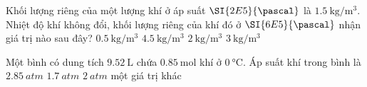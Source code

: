 \begin{ex}
	Khối lượng riêng của một lượng khí ở áp suất $\SI{2E5}{\pascal}$ là $\SI{1.5}{\kilogram/\meter^3}$. Nhiệt độ khí không đổi, khối lượng riêng của khí đó ở $\SI{6E5}{\pascal}$ nhận giá trị nào sau đây?
	\choice
	{$\SI{0.5}{\kilogram/\meter^3}$}
	{\True $\SI{4.5}{\kilogram/\meter^3}$}
	{$\SI{2}{\kilogram/\meter^3}$}
	{$\SI{3}{\kilogram/\meter^3}$}
\end{ex}
\begin{ex}
Một bình có dung tích $\SI{9.52}{\liter}$ chứa $\SI{0.85}{\mole}$ khí ở $\SI{0}{\celsius}$. Áp suất khí trong bình là	
	\choice
	{$\SI{2.85}{atm}$}
	{$\SI{1.7}{atm}$}
	{\True $\SI{2}{atm}$}
	{một giá trị khác}
\end{ex}

